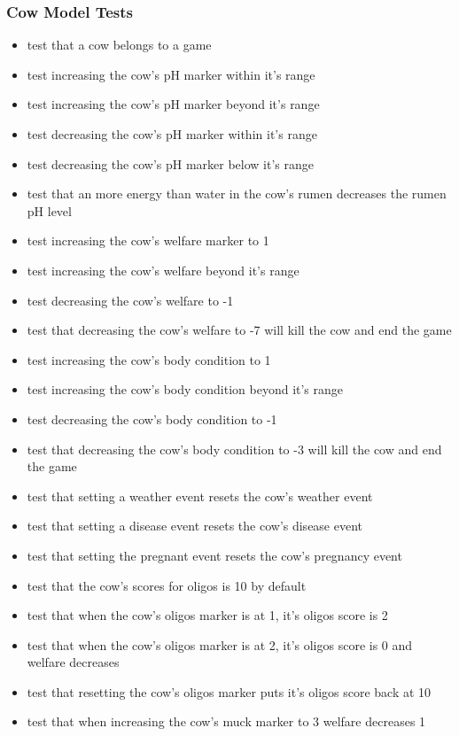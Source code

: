 \subsubsection{Cow Model Tests}
\begin{itemize}
	\item test that a cow belongs to a game
	\item test increasing the cow's pH marker within it's range
	\item test increasing the cow's pH marker beyond it's range
	\item test decreasing the cow's pH marker within it's range
	\item test decreasing the cow's pH marker below it's range
	\item test that an more energy than water in the cow's rumen decreases the rumen pH level
	\item test increasing the cow's welfare marker to 1
	\item test increasing the cow's welfare beyond it's range
	\item test decreasing the cow's welfare to -1
	\item test that decreasing the cow's welfare to -7 will kill the cow and end the game
	\item test increasing the cow's body condition to 1
	\item test increasing the cow's body condition beyond it's range
	\item test decreasing the cow's body condition to -1
	\item test that decreasing the cow's body condition to -3 will kill the cow and end the game
	\item test that setting a weather event resets the cow's weather event
	\item test that setting a disease event resets the cow's disease event
	\item test that setting the pregnant event resets the cow's pregnancy event
	\item test that the cow's scores for oligos is 10 by default
	\item test that when the cow's oligos marker is at 1, it's oligos score is 2
	\item test that when the cow's oligos marker is at 2, it's oligos score is 0 and welfare decreases
	\item test that resetting the cow's oligos marker puts it's oligos score back at 10
	\item test that when increasing the cow's muck marker to 3 welfare decreases 1

\end{itemize}
